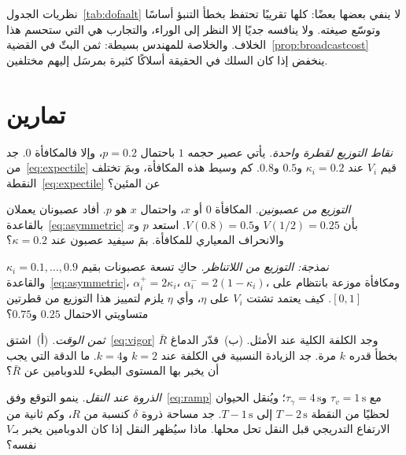 نظريات الجدول~\ref{tab:dofaalt} لا ينفي بعضها بعضًا: كلها تقريبًا تحتفظ بخطأ التنبؤ أساسًا وتوسّع صيغته. ولا ينافسه جديًا إلا النظر إلى الوراء، والتجارب هي التي ستحسم هذا الخلاف. والخلاصة للمهندس بسيطة: ثمن البثّ في القضية~\ref{prop:broadcastcost} ينخفض إذا كان السلك في الحقيقة أسلاكًا كثيرة بمرسَل إليهم مختلفين.

\section{تمارين}

\begin{exercise}[\lvlA]
\label{ex:07:1}
\emph{نقاط التوزيع لقطرة واحدة.} يأتي عصير حجمه $1$ باحتمال $p=0.2$، وإلا فالمكافأة $0$. جد من~\eqref{eq:expectile} قيم $V_i$ عند $\kappa_i=0.2$ و$0.5$ و$0.8$. كم وسيط هذه المكافأة، وبمَ تختلف النقطة~\eqref{eq:expectile} عن المئين؟
\end{exercise}

\begin{exercise}[\lvlB]
\label{ex:07:2}
\emph{التوزيع من عصبونين.} المكافأة $0$ أو $x$، واحتمال $x$ هو $p$. أفاد عصبونان يعملان بالقاعدة~\eqref{eq:asymmetric} بأن $V(1/2)=0.25$ و$V(0.8)=0.5$. استعد $p$ و$x$ والانحراف المعياري للمكافأة. بمَ سيفيد عصبون عند $\kappa=0.2$؟
\end{exercise}

\begin{exercise}[\lvlB]
\label{ex:07:3}
\emph{نمذجة: التوزيع من اللاتناظر.} حاكِ تسعة عصبونات  بقيم $\kappa_i=0.1,\dots,0.9$ والقاعدة~\eqref{eq:asymmetric}، $\alpha_i^+=2\kappa_i$، $\alpha_i^-=2(1-\kappa_i)$، ومكافأة موزعة بانتظام على $[0,1]$. كيف يعتمد تشتت $V_i$ على $\eta$، وأي $\eta$ يلزم لتمييز هذا التوزيع من قطرتين متساويتي الاحتمال $0.25$ و$0.75$؟
\end{exercise}

\begin{exercise}[\lvlA]
\label{ex:07:4}
\emph{ثمن الوقت.} (أ)~اشتق~\eqref{eq:vigor} وجد الكلفة الكلية عند الأمثل. (ب)~قدّر الدماغ $\bar R$ بخطأ قدره $k$ مرة. جد الزيادة النسبية في الكلفة عند $k=2$ و$k=4$. ما الدقة التي يجب أن يخبر بها المستوى البطيء للدوبامين عن $\bar R$؟
\end{exercise}

\begin{exercise}[\lvlB]
\label{ex:07:5}
\emph{الذروة عند النقل.} ينمو التوقع وفق~\eqref{eq:ramp} مع $\tau_v=1\,\text{s}$ و$\tau_\gamma=4\,\text{s}$؛ ويُنقل الحيوان لحظيًا من النقطة $T-2\,\text{s}$ إلى $T-1\,\text{s}$. جد مساحة ذروة $\delta$ كنسبة من $R$، وكم ثانية من الارتفاع التدريجي قبل النقل تحل محلها. ماذا سيُظهر النقل إذا كان الدوبامين يخبر بـ$V$ نفسه؟
\end{exercise}

